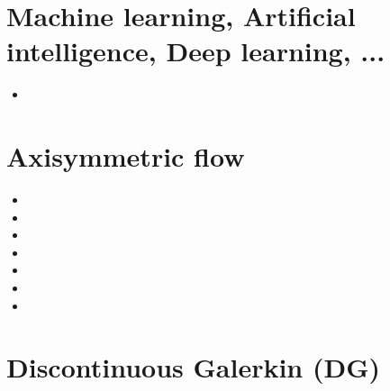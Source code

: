 
\section{Machine learning, Artificial intelligence, Deep learning, ...}

\begin{scriptsize}
\begin{itemize}
\item[\twothousandtwentyone] 
\end{itemize}
\end{scriptsize}


\section{Axisymmetric flow}

\begin{scriptsize}
\begin{itemize}
\item[\nineteenninetytwo] 
\item[\nineteenninetyseven] 
\item[\twothousandthree] 
\item[\twothousandfour] 
\item[\twothousandseven] 
\item[\twothousandten] 
\item[\twothousandtwelve] 
\end{itemize}
\end{scriptsize}

\section{Discontinuous Galerkin (DG)}

